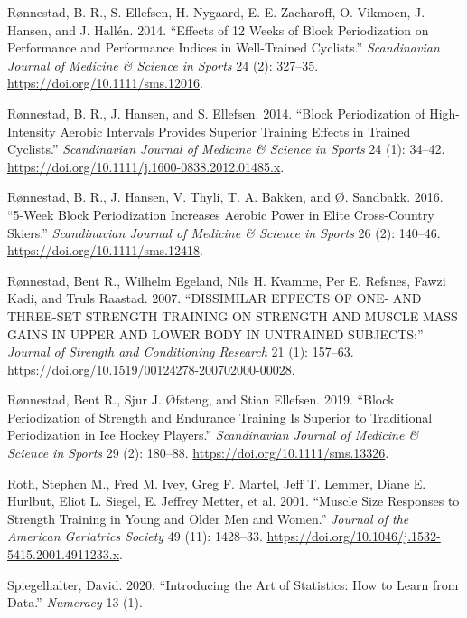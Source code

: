 \documentclass[
  letterpaper,
  DIV=11,
  numbers=noendperiod]{scrreprt}
\newlength{\cslhangindent}
\newenvironment{CSLReferences}[2] %
 {\begin{list}{}{%
  \setlength{\itemindent}{0pt}
  \setlength{\leftmargin}{0pt}
  \setlength{\parsep}{0pt}
  \ifodd #1
   \setlength{\leftmargin}{\cslhangindent}
   \setlength{\itemindent}{-1\cslhangindent}
  \fi
  \setlength{\itemsep}{#2\baselineskip}}}
 {\end{list}}
\begin{document}
\begin{CSLReferences}{1}{0}
Rønnestad, B. R., S. Ellefsen, H. Nygaard, E. E. Zacharoff, O. Vikmoen,
J. Hansen, and J. Hallén. 2014. {``Effects of 12 Weeks of Block
Periodization on Performance and Performance Indices in Well{-}Trained
Cyclists.''} \emph{Scandinavian Journal of Medicine \& Science in
Sports} 24 (2): 327--35. \url{https://doi.org/10.1111/sms.12016}.

Rønnestad, B. R., J. Hansen, and S. Ellefsen. 2014. {``Block
Periodization of High{-}Intensity Aerobic Intervals Provides Superior
Training Effects in Trained Cyclists.''} \emph{Scandinavian Journal of
Medicine \& Science in Sports} 24 (1): 34--42.
\url{https://doi.org/10.1111/j.1600-0838.2012.01485.x}.

Rønnestad, B. R., J. Hansen, V. Thyli, T. A. Bakken, and Ø. Sandbakk.
2016. {``5{-}Week Block Periodization Increases Aerobic Power in Elite
Cross{-}Country Skiers.''} \emph{Scandinavian Journal of Medicine \&
Science in Sports} 26 (2): 140--46.
\url{https://doi.org/10.1111/sms.12418}.

Rønnestad, Bent R., Wilhelm Egeland, Nils H. Kvamme, Per E. Refsnes,
Fawzi Kadi, and Truls Raastad. 2007. {``DISSIMILAR EFFECTS OF ONE- AND
THREE-SET STRENGTH TRAINING ON STRENGTH AND MUSCLE MASS GAINS IN UPPER
AND LOWER BODY IN UNTRAINED SUBJECTS:''} \emph{Journal of Strength and
Conditioning Research} 21 (1): 157--63.
\url{https://doi.org/10.1519/00124278-200702000-00028}.

Rønnestad, Bent R., Sjur J. Øfsteng, and Stian Ellefsen. 2019. {``Block
Periodization of Strength and Endurance Training Is Superior to
Traditional Periodization in Ice Hockey Players.''} \emph{Scandinavian
Journal of Medicine \& Science in Sports} 29 (2): 180--88.
\url{https://doi.org/10.1111/sms.13326}.

Roth, Stephen M., Fred M. Ivey, Greg F. Martel, Jeff T. Lemmer, Diane E.
Hurlbut, Eliot L. Siegel, E. Jeffrey Metter, et al. 2001. {``Muscle Size
Responses to Strength Training in Young and Older Men and Women.''}
\emph{Journal of the American Geriatrics Society} 49 (11): 1428--33.
\url{https://doi.org/10.1046/j.1532-5415.2001.4911233.x}.

Spiegelhalter, David. 2020. {``Introducing the Art of Statistics: How to
Learn from Data.''} \emph{Numeracy} 13 (1).


\end{CSLReferences}
\end{document}
